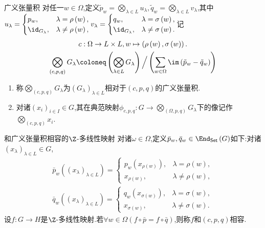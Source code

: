 \begin{definition}{广义张量积}{}
	对任一$w\in\Omega$,定义$\tilde{p}_{w}=\bigotimes\limits_{\lambda\in L}u_{\lambda},\tilde{q}_{w}=\bigotimes\limits_{\lambda\in L}v_{\lambda}$,其中$
	u_{\lambda}=
	\begin{cases}
		p_{w},&\lambda=\rho\left(w\right),\\
		\id_{G_{\lambda}},&\lambda\neq\rho\left(w\right),
	\end{cases}
	v_{\lambda}=
	\begin{cases}
		q_{w},&\lambda=\sigma\left(w\right),\\
		\id_{G_{\lambda}},&\lambda\neq\sigma\left(w\right).
	\end{cases}$记
	\begin{gather*}
		c:\Omega\to L\times L,w\mapsto\left(\rho\left(w\right),\sigma\left(w\right)\right).\\
		\bigotimes\limits_{\left(c,p,q\right)}G_{\lambda}\coloneq\left(\bigotimes\limits_{\lambda\in L}G_{\lambda}\right)\Big/\left(\sum\limits_{w\in\Omega}\im\left(\tilde{p}_{w}-\tilde{q}_{w}\right)\right)
	\end{gather*}
	\begin{enumerate}
		\item 称$\bigotimes\limits_{\left(c,p,q\right)}G_{\lambda}$为$\left(G_{\lambda}\right)_{\lambda\in L}$相对于$\left(c,p,q\right)$的广义张量积.
		\item 对诸$\left(x_{i}\right)_{i\in I}\in G$,其在典范映射$\phi_{c,p,q}:G\to\bigotimes\limits_{\left(\Omega,p,q\right)}G_{\lambda}$下的像记作$\bigotimes\limits_{\left(c,p,q\right)}x_{i}$.
	\end{enumerate}
\end{definition}

\begin{definition}{和广义张量积相容的$\Z$-多线性映射}{}
	对诸$\omega\in\Omega$,定义$\bar{p}_{w},\bar{q}_{w}\in\End_{\mathsf{Set}}\left(G\right)$如下:对诸$\left(x_{\lambda}\right)_{\lambda\in L}\in G$,
	\begin{align*}
		\bar{p}_{w}\left(\left(x_{\lambda}\right)_{\lambda\in L}\right)=
		\begin{cases}
			p_{w}\left(x_{\rho\left(w\right)}\right),&\lambda=\rho\left(w\right),\\
			x_{\rho\left(w\right)},&\lambda\neq\rho\left(w\right),
		\end{cases}
		\\
		\bar{q}_{w}\left(\left(x_{\lambda}\right)_{\lambda\in L}\right)=
		\begin{cases}
			q_{w}\left(x_{\sigma\left(w\right)}\right),&\lambda=\sigma\left(w\right),\\
			x_{\sigma\left(w\right)},&\lambda\neq\sigma\left(w\right).
		\end{cases}
	\end{align*}
	设$f:G\to H$是$\Z$-多线性映射.若$\forall w\in\Omega\left(f\circ\bar{p}=f\circ\bar{q}\right)$,则称$f$和$\left(c,p,q\right)$相容.
\end{definition}


